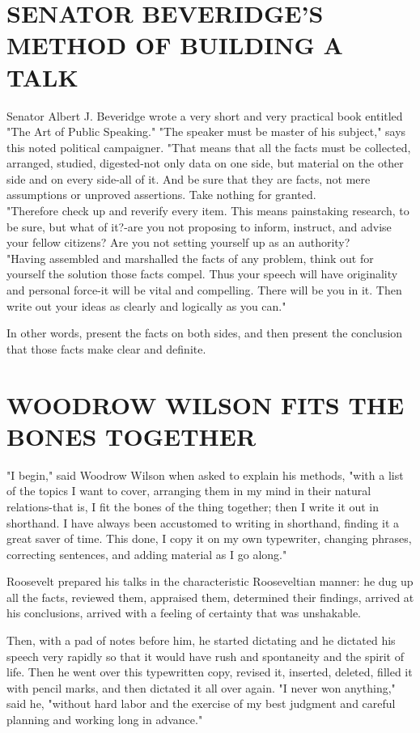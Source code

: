 \documentclass[10pt]{article}
\begin{document}
\section*{SENATOR BEVERIDGE'S METHOD OF BUILDING A TALK}
Senator Albert J. Beveridge wrote a very short and very practical book entitled "The Art of Public Speaking." "The speaker must be master of his subject," says this noted political campaigner. "That means that all the facts must be collected,\\
arranged, studied, digested-not only data on one side, but material on the other side and on every side-all of it. And be sure that they are facts, not mere assumptions or unproved assertions. Take nothing for granted.\\
"Therefore check up and reverify every item. This means painstaking research, to be sure, but what of it?-are you not proposing to inform, instruct, and advise your fellow citizens? Are you not setting yourself up as an authority?\\
"Having assembled and marshalled the facts of any problem, think out for yourself the solution those facts compel. Thus your speech will have originality and personal force-it will be vital and compelling. There will be you in it. Then write out your ideas as clearly and logically as you can."

In other words, present the facts on both sides, and then present the conclusion that those facts make clear and definite.

\section*{WOODROW WILSON FITS THE BONES TOGETHER}
"I begin," said Woodrow Wilson when asked to explain his methods, "with a list of the topics I want to cover, arranging them in my mind in their natural relations-that is, I fit the bones of the thing together; then I write it out in shorthand. I have always been accustomed to writing in shorthand, finding it a great saver of time. This done, I copy it on my own typewriter, changing phrases, correcting sentences, and adding material as I go along."

Roosevelt prepared his talks in the characteristic Rooseveltian manner: he dug up all the facts, reviewed them, appraised them, determined their findings, arrived at his conclusions, arrived with a feeling of certainty that was unshakable.

Then, with a pad of notes before him, he started dictating and he dictated his speech very rapidly so that it would have rush and spontaneity and the spirit of life. Then he went over this typewritten copy, revised it, inserted, deleted, filled it with pencil marks, and then dictated it all over again. "I never won anything," said he, "without hard labor and the exercise of my best judgment and careful planning and working long in advance."
\end{document}
